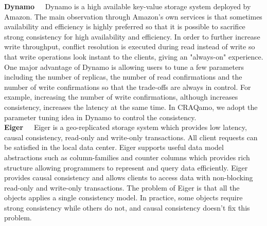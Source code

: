 {\noindent \bf Dynamo\ \ } Dynamo\cite{decandia2007dynamo} is a high available key-value storage system deployed by Amazon. The main observation through Amazon's own services is that sometimes availability and efficiency is highly preferred so that it is possible to sacrifice strong consistency for high availability and efficiency. In order to further increase write throughput, conflict resolution is executed during read instead of write so that write operations look instant to the clients, giving an "always-on" experience. One major advantage of Dynamo is allowing users to tune a few parameters including the number of replicas, the number of read confirmations and the number of write confirmations so that the trade-offs are always in control. For example, increasing the number of write confirmations, although increases consistency, increases the latency at the same time. In CRAQamo, we adopt the parameter tuning idea in Dynamo to control the consistency. \\

{\noindent \bf Eiger\ \ } Eiger\cite{lloyd2013stronger} is a geo-replicated storage system which provides low latency, causal consistency, read-only and write-only transactions. All client requests can be satisfied in the local data center. Eiger supports useful data model abstractions such as column-families and counter columns which provides rich structure allowing programmers to represent and query data efficiently. Eiger provides causal consistency and allows clients to access data with non-blocking read-only and write-only transactions. The problem of Eiger is that all the objects applies a single consistency model. In practice, some objects require strong consistency while others do not, and causal consistency doesn't fix this problem. 
\label{sec:related}


